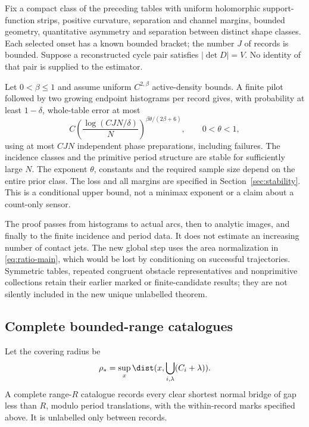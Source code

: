 \begin{theorem}\label{thm:stat-main}
Fix a compact class of the preceding tables with uniform holomorphic
support-function strips, positive curvature, separation and channel
margins, bounded geometry, quantitative asymmetry and separation between
distinct shape classes. Each selected onset has a known bounded bracket;
the number $J$ of records is bounded. Suppose a reconstructed cycle pair
satisfies $|\det D|=V$. No identity of that pair is supplied to the estimator.

Let $0<\beta\le1$ and assume uniform $C^{2,\beta}$ active-density bounds.
A finite pilot followed by two growing endpoint histograms per record
gives, with probability at least $1-\delta$, whole-table error at most
\begin{equation}\label{eq:rate-main}
 C\left(\frac{\log(CJN/\delta)}{N}\right)^{\beta\theta/(2\beta+6)},
                       \qquad 0<\theta<1,
\end{equation}
using at most $CJN$ independent phase preparations, including failures.
The incidence classes and the primitive period structure are stable for
sufficiently large $N$. The exponent $\theta$, constants and the required
sample size depend on the entire prior class. The loss and all margins
are specified in Section~\ref{sec:stability}. This is a conditional upper
bound, not a minimax exponent or a claim about a count-only sensor.
\end{theorem}

The proof passes from histograms to actual arcs, then to analytic images,
and finally to the finite incidence and period data. It does not estimate
an increasing number of contact jets. The new global step uses the area
normalization in \eqref{eq:ratio-main}, which would be lost by conditioning
on successful trajectories. Symmetric tables, repeated congruent obstacle
representatives and nonprimitive collections retain their earlier marked
or finite-candidate results; they are not silently included in the new
unique unlabelled theorem.

\subsection{Complete bounded-range catalogues}
Let the covering radius be
\[\rho_* =\sup_x\dist(x,\bigcup_{i,\lambda}(C_i+\lambda)).\]
A complete range-$R$ catalogue records every clear shortest normal bridge
of gap less than $R$, modulo period translations, with the within-record
marks specified above. It is unlabelled only between records.

